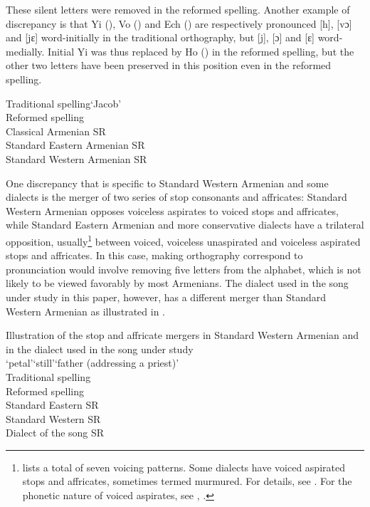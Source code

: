 \documentclass[output=paper,colorlinks,citecolor=brown]{langscibook}
\begin{document}
These silent letters were removed in the reformed spelling.  Another example of discrepancy is that Yi (), Vo () and Ech () are respectively pronounced [h], [vɔ] and [jɛ] word-initially in the traditional orthography, but [j], [ɔ] and [ɛ] word-medially.  Initial Yi was thus replaced by Ho () in the reformed spelling, but the other two letters have been preserved in this position even in the reformed spelling.


\begin{exe}
    \ex \label{baronian:ex3} Traditional spelling\tab \tab				{}\tab	`Jacob’\\
Reformed spelling\tab	\tab			\armenian{Հակոբ}\tab\\
Classical Armenian SR\tab 			[jɑkob]\tab \\
Standard Eastern Armenian SR\tab		[hɑkob]\tab \\
Standard Western Armenian SR\tab 
\end{exe}

One discrepancy that is specific to Standard Western Armenian and some dialects is the merger of two series of stop consonants and affricates: Standard Western Armenian opposes voiceless aspirates to voiced stops and affricates, while Standard Eastern Armenian and more conservative dialects have a trilateral opposition, usually\footnote{\citet{Pisowicz1976} lists a total of seven voicing patterns.  Some dialects have voiced aspirated stops and affricates, sometimes termed murmured.  For details, see \citet{Baronian2017}.  For the phonetic nature of voiced aspirates, see \citet{Khachaturian1992}, \citet{SeyfarthaGarellek2018}.} between voiced, voiceless unaspirated and voiceless aspirated stops and affricates.  In this case, making orthography correspond to pronunciation would involve removing five letters from the alphabet, which is not likely to be viewed favorably by most Armenians.  The dialect used in the song under study in this paper, however, has a different merger than Standard Western Armenian as illustrated in .

\begin{exe}
    \ex \label{baronian:ex4} Illustration of the stop and affricate mergers in Standard Western Armenian and in the dialect used in the song under study\smallskip\\
    \tab \tab \tab ‘petal’\tab    ‘still’\tab    ‘father (addressing a priest)’\\
    Traditional spelling\tab    {}\tab    {}\tab    {}\\
    Reformed spelling\tab     {}\tab    {}\tab    {}\\
    Standard Eastern SR\tab    [tʰɛɾ]\tab    [dɛr]\tab    [tɛɾ]\\
    Standard Western SR\tab  [tʰɛɾ]\tab    [tʰɛɾ]\tab    [dɛɾ]\\
    Dialect of the song SR\tab  [tʰɛɾ]\tab    [dɛɾ]\tab    [dɛɾ]
    
\end{exe}
\end{document}
